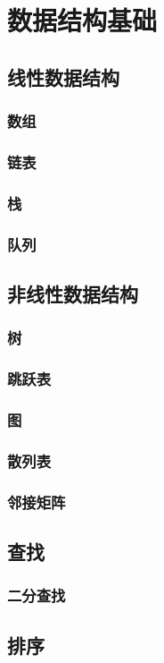\chapter{数据结构基础}
\section{线性数据结构}
\subsection{数组}
\subsection{链表}
\subsection{栈}
\subsection{队列}
\section{非线性数据结构}
\subsection{树}
\subsection{跳跃表}
\subsection{图}
\subsection{散列表}
\subsection{邻接矩阵}

\section{查找}
\subsection{二分查找}
\section{排序}
